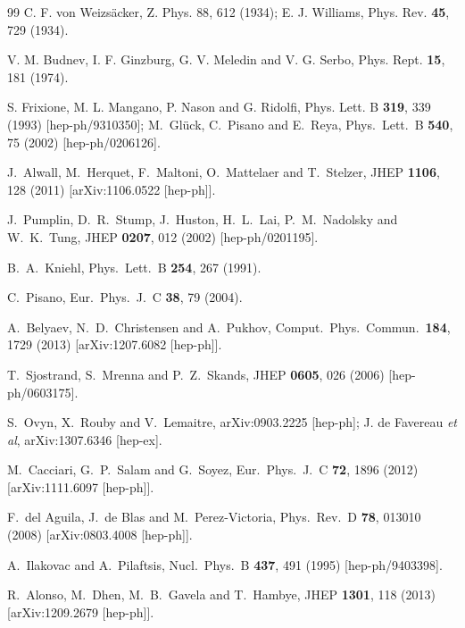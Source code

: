 \documentclass[reprint,prl,twocolumn,superscriptaddress,showpacs,nofootinbib,floatfix,preprintnumbers]{revtex4-1}
\begin{document}
\begin{thebibliography}{99}
 C. F. von Weizs\"{a}cker, Z. Phys. {88}, 612 (1934);  
E. J. Williams, Phys. Rev. {\bf 45}, 729 (1934). 

 V. M. Budnev, I. F. Ginzburg, G. V. Meledin and V. G. Serbo, 
Phys. Rept. {\bf 15}, 181 (1974). 
 
S. Frixione, M. L. Mangano, P. Nason and G. Ridolfi, 
Phys. Lett. B {\bf 319}, 339 (1993) [hep-ph/9310350]; 
M.~Gl\"{u}ck, C.~Pisano and E.~Reya,
  Phys.\ Lett.\ B {\bf 540}, 75 (2002) [hep-ph/0206126].

  J.~Alwall, M.~Herquet, F.~Maltoni, O.~Mattelaer and T.~Stelzer,
  JHEP {\bf 1106}, 128 (2011) [arXiv:1106.0522 [hep-ph]].

  J.~Pumplin, D.~R.~Stump, J.~Huston, H.~L.~Lai, P.~M.~Nadolsky and W.~K.~Tung,
  JHEP {\bf 0207}, 012 (2002) [hep-ph/0201195].

  B.~A.~Kniehl,
  Phys.\ Lett.\ B {\bf 254}, 267 (1991).

  C.~Pisano,
  Eur.\ Phys.\ J.\ C {\bf 38}, 79 (2004). 

 A.~Belyaev, N.~D.~Christensen and A.~Pukhov,
  Comput.\ Phys.\ Commun.\  {\bf 184}, 1729 (2013) [arXiv:1207.6082 [hep-ph]].

   T.~Sjostrand, S.~Mrenna and P.~Z.~Skands,
  JHEP {\bf 0605}, 026 (2006) [hep-ph/0603175].

  S.~Ovyn, X.~Rouby and V.~Lemaitre,
  arXiv:0903.2225 [hep-ph]; J. de Favereau {\it et al}, 
arXiv:1307.6346 [hep-ex]. 

  M.~Cacciari, G.~P.~Salam and G.~Soyez,
  Eur.\ Phys.\ J.\ C {\bf 72}, 1896 (2012) [arXiv:1111.6097 [hep-ph]].


 F.~del Aguila, J.~de Blas and M.~Perez-Victoria,
  Phys.\ Rev.\ D {\bf 78}, 013010 (2008) [arXiv:0803.4008 [hep-ph]].

 A.~Ilakovac and A.~Pilaftsis,
  Nucl.\ Phys.\ B {\bf 437}, 491 (1995) [hep-ph/9403398].  

  R.~Alonso, M.~Dhen, M.~B.~Gavela and T.~Hambye,
  JHEP {\bf 1301}, 118 (2013) [arXiv:1209.2679 [hep-ph]].

\end{thebibliography}
\end{document}

